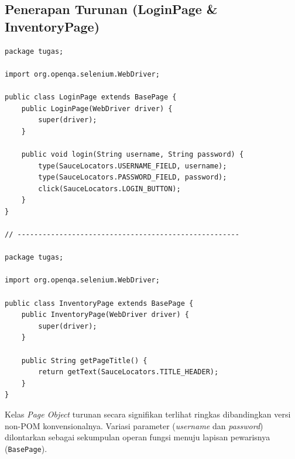 \documentclass[a4paper,oneside,12pt]{report}
\begin{document}
\subsection{Penerapan Turunan (LoginPage \& InventoryPage)}
\begin{lstlisting}[style=javastyle, caption=Kelas \texttt{LoginPage.java} dan \texttt{InventoryPage.java}]
package tugas;

import org.openqa.selenium.WebDriver;

public class LoginPage extends BasePage {
    public LoginPage(WebDriver driver) {
        super(driver);
    }

    public void login(String username, String password) {
        type(SauceLocators.USERNAME_FIELD, username);
        type(SauceLocators.PASSWORD_FIELD, password);
        click(SauceLocators.LOGIN_BUTTON);
    }
}

// -----------------------------------------------------

package tugas;

import org.openqa.selenium.WebDriver;

public class InventoryPage extends BasePage {
    public InventoryPage(WebDriver driver) {
        super(driver);
    }

    public String getPageTitle() {
        return getText(SauceLocators.TITLE_HEADER);
    }
}
\end{lstlisting}
Kelas \textit{Page Object} turunan secara signifikan terlihat ringkas dibandingkan versi non-POM konvensionalnya. Variasi parameter (\textit{username} dan \textit{password}) dilontarkan sebagai sekumpulan operan fungsi menuju lapisan pewarisnya (\texttt{BasePage}).
\end{document}
